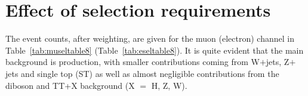 


\section{Effect of selection requirements \label{cutflow}}

The event counts, after weighting, are given for the muon (electron) channel in Table~\ref{tab:museltable8} (Table~\ref{tab:eseltable8}). It is quite evident that the main background is \ttbar production, with smaller contributions coming from W$+$jets, Z$+$jets and single top (ST) as well as almost negligible contributions from the diboson and TT+X background (X $=$ H, Z, W).




